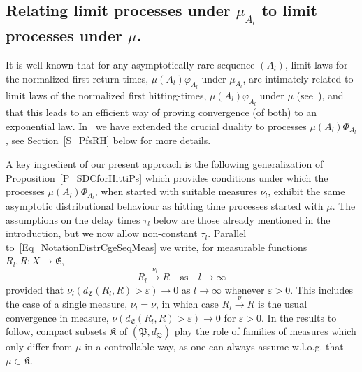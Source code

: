 \documentclass[AHL,Unicode,longabstracts]{cedram}
\newcommand{\frkK}{\mathfrak{K}}
\newcommand{\frkP}{\mathfrak{P}}
\newcommand{\frkE}{\mathfrak{E}}
\begin{document}
\subsection{Relating limit processes under $\mu_{A_{l}}$ to limit processes under $\mu$.}
It is well known that for any asymptotically rare sequence $(A_{l})$, limit laws for the normalized first return-times, $\mu(A_{l})\varphi_{A_{l}}$ under $\mu_{A_{l}}$, are intimately related to limit laws of the normalized first hitting-times, $\mu(A_{l})\varphi_{A_{l}}$ under $\mu$ (see~\cite{AS,HaydnLacVai05}), and that this leads to an efficient way of proving convergence (of both) to an exponential law. In~\cite{Z11} we have extended the crucial duality to processes $\mu(A_{l})\Phi_{A_{l}}$, see Section~\ref{S_PfsRH} below for more details.

A key ingredient of our present approach is the following generalization of Proposition~\ref{P_SDCforHittiPs} which provides conditions under which the processes $\mu(A_{l})\Phi_{A_{l}}$, when started with suitable measures $\nu_{l}$, exhibit the same asymptotic distributional behaviour as hitting time processes started with $\mu$. The assumptions on the delay times $\tau_{l}$ below are those already mentioned in the introduction, but we now allow non-constant $\tau_{l}$. Parallel to~\eqref{Eq_NotationDistrCgeSeqMeas} we write, for measurable functions $R_{l},R:X\rightarrow\frkE$,
\begin{equation}\label{Eq_NotationProbaCgeSeqMeas}
R_{l}\overset{\nu_{l}}{\longrightarrow}R\quad \text{as}\quad l\rightarrow\infty
\end{equation}
provided that $\nu_{l}(d_{\frkE}(R_{l},R)>\varepsilon)\rightarrow0$ as $l\rightarrow\infty$ whenever $\varepsilon>0$. This includes the case of a single measure, $\nu_{l}=\nu$, in which case $R_{l}\overset{\nu} {\longrightarrow}R$ is the usual convergence in measure, $\nu(d_{\frkE }(R_{l},R)>\varepsilon)\rightarrow0$ for $\varepsilon>0$. In the results to follow, compact subsets $\frkK$ of $(\frkP,d_{\frkP})$ play the role of families of measures which only differ from $\mu$ in a controllable way, as one can always assume w.l.o.g. that $\mu\in\frkK$.
\end{document}
